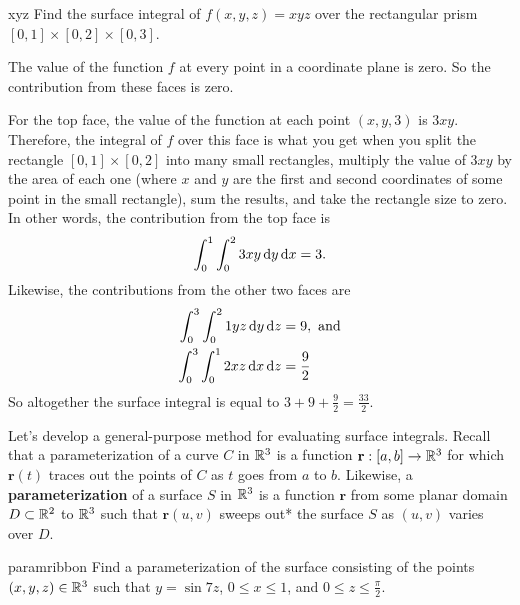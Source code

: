 \documentclass{watsonbook}
\begin{document}
\begin{example}{}{xyz}
  Find the surface integral of $f(x,y,z) = xyz$ over the rectangular
  prism $[0,1] \times [0,2] \times [0,3]$. 
\end{example}

\begin{solution}
  The value of the function $f$ at every point in a coordinate plane
  is zero. So the contribution from these faces is zero.

  For the top face, the value of the function at each point $(x,y,3)$
  is $3xy$. Therefore, the integral of $f$ over this face is what you
  get when you split the rectangle $[0,1] \times [0,2]$ into many
  small rectangles, multiply the value of $3xy$ by the area of each
  one (where $x$ and $y$ are the first and second coordinates of some
  point in the small rectangle), sum the results, and take the
  rectangle size to zero. In other words, the contribution from the
  top face is
  \[
    \int_0^1 \int_0^2 3xy \, \mathrm{d} y\, \mathrm{d} x = 3. 
  \]
  Likewise, the contributions from the other two faces are
  \begin{align*}
    \int_0^3 \int_0^2 1yz \, \mathrm{d} y\, \mathrm{d} z &= 9, \text{ and} \\
    \int_{0}^{3}
    \int_{0}^{1}2xz \, \mathrm{d} x\,
    \mathrm{d} z &= \frac{9}{2}
  \end{align*}
  So altogether the surface integral is equal to $\displaystyle{3 + 9 +
    \frac{9}{2}} = \boxed{\frac{33}{2}}$. 
\end{solution}

Let's develop a general-purpose method for evaluating surface
integrals. Recall that a parameterization of a curve $C$ in $\mathbb{R}^3$ is
a function $\mathbf{r}: [a,b] \to \mathbb{R}^3$ for which $\mathbf{r}(t)$
traces out the points of $C$ as $t$ goes from $a$ to $b$. Likewise, a
\textbf{parameterization} of a surface $S$ in $\mathbb{R}^3$ is a function
$\mathbf{r}$ from some planar domain $D \subset \mathbb{R}^2$ to $\mathbb{R}^3$ such
that $\mathbf{r}(u,v)$ sweeps out*  the
surface $S$ as $(u,v)$ varies over $D$.

\begin{example}{}{paramribbon}
  Find a parameterization of the surface consisting of the points
  $(x,y,z) \in \mathbb{R}^3$ such that $y = \sin 7z$, $0 \leq x \leq 1$, and
  $0 \leq z \leq \frac{\pi}{2}$. 
\end{example}
\end{document}
